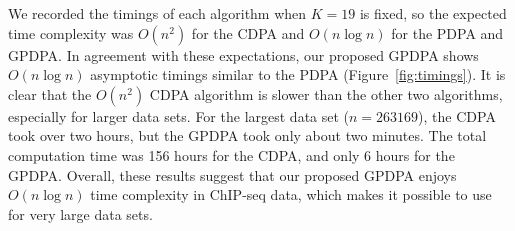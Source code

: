 \documentclass{article}
\begin{document}
We recorded the timings of each algorithm when $K=19$ is fixed, so the
expected time complexity was $O(n^2)$ for the CDPA and $O(n \log n)$
for the PDPA and GPDPA. In agreement with these expectations, our
proposed GPDPA shows $O(n\log n)$ asymptotic timings similar to the
PDPA (Figure~\ref{fig:timings}). It is clear that the $O(n^2)$
CDPA algorithm is slower than the other two algorithms,
especially for larger data sets. For the largest data set
($n=263169$), the CDPA took over two hours, but the GPDPA took only
about two minutes. The total computation time was 156 hours for the
CDPA, and only 6 hours for the GPDPA. Overall, these results suggest
that our proposed GPDPA enjoys $O(n\log n)$ time complexity in
ChIP-seq data, which makes it possible to use for very large data
sets.




\end{document}
